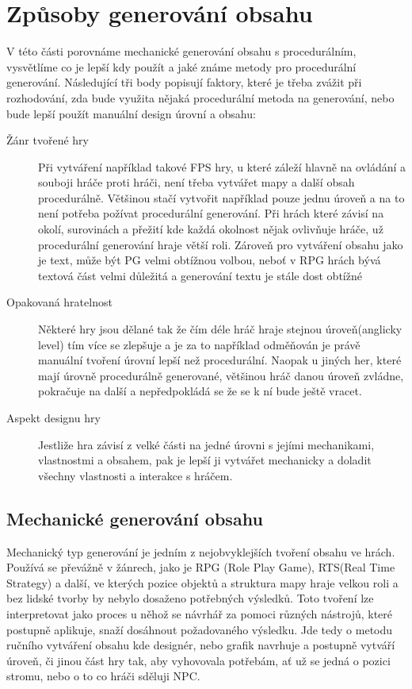 \section{Způsoby generování obsahu}
V této části porovnáme mechanické generování obsahu s procedurálním, vysvětlíme co je lepší kdy použít a jaké známe metody pro procedurální generování. Následující tři body popisují faktory, které je třeba zvážit při rozhodování, zda bude využita nějaká procedurální metoda na generování, nebo bude lepší použít manuální design úrovní a obsahu:
\begin{description}
	\item[Žánr tvořené hry] Při vytváření například takové FPS hry, u které záleží hlavně na ovládání a souboji hráče proti hráči, není třeba vytvářet mapy a další obsah procedurálně. Většinou stačí vytvořit například pouze jednu úroveň a na to není potřeba požívat procedurální generování. Při hrách které závisí na okolí, surovinách a přežití kde každá okolnost nějak ovlivňuje hráče, už procedurální generování hraje větší roli. Zároveň pro vytváření obsahu jako je text, může být PG velmi obtížnou volbou, neboť v RPG hrách bývá textová část velmi důležitá a generování textu je stále dost obtížné
	\item[Opakovaná hratelnost] Některé hry jsou dělané tak že čím déle hráč hraje stejnou úroveň(anglicky level) tím více se zlepšuje a je za to například odměňován je právě manuální tvoření úrovní lepší než procedurální. Naopak u jiných her, které mají úrovně procedurálně generované, většinou hráč danou úroveň zvládne, pokračuje na další a nepředpokládá se že se k ní bude ještě vracet.
	\item[Aspekt designu hry] Jestliže hra závisí z velké části na jedné úrovni s jejími mechanikami, vlastnostmi a obsahem, pak je lepší ji vytvářet mechanicky a doladit všechny vlastnosti a interakce s hráčem.
\end{description}


\subsection{Mechanické generování obsahu}
\label{traditional}
Mechanický typ generování je jedním z nejobvyklejších tvoření obsahu ve hrách. Používá se převážně v žánrech, jako je RPG (Role Play Game), RTS(Real Time Strategy) a další, ve kterých pozice objektů a struktura mapy hraje velkou roli a bez lidské tvorby by nebylo dosaženo potřebných výsledků. Toto tvoření lze interpretovat jako proces u něhož se návrhář za pomoci různých nástrojů, které postupně aplikuje, snaží dosáhnout požadovaného výsledku. Jde tedy o metodu ručního vytváření obsahu kde designér, nebo grafik navrhuje a postupně vytváří úroveň, či jinou část hry tak, aby vyhovovala potřebám, ať už se jedná o pozici stromu, nebo o to co hráči sděluji NPC.
	

